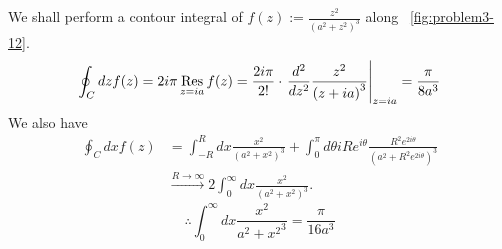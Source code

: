 \item

We shall perform a contour integral of $f(z) := \frac{z^2}{{\left( a^2 + z^2 \right)}^3}$ along ~\ref{fig:problem3-12}.
\[
	\oint_C dz f(z)
	= 2i\pi \mathop{\mathrm{Res}}_{z = ia} f(z)
	= \frac{2i\pi}{2!} \cdot {\left. \frac{d^2}{dz^2} \frac{z^2}{{\left( z + ia \right)}^3} \right|}_{z = ia}
	= \frac{\pi}{8a^3}
\]
We also have
\begin{align*}
	\oint_C dx f(z)
    &= \int_{-R}^{R} dx \frac{x^2}{{\left( a^2 + x^2 \right)}^3}
     + \int_0^{\pi} d\theta iRe^{i\theta} \frac{R^2 e^{2i\theta}}{{\left( a^2 + R^2 e^{2i\theta} \right)}^3}     \\
    &\xrightarrow{R \rightarrow \infty} 2\int_0^\infty dx \frac{x^2}{{\left( a^2 + x^2 \right)}^3}.
\end{align*}
\[
	\therefore \int_0^\infty dx \frac{x^2}{{a^2 + x^2}^3} = \frac{\pi}{16a^3}
\]